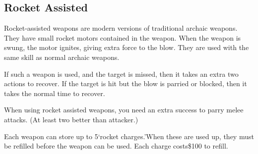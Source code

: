 \documentclass[twoside]{book}
\begin{document}
\begin{multicols}{2}
\hspace{-2ex}
\vspace{1ex}


    


\hspace{-2ex}
\vspace{1ex}


    
\end{multicols}
  
    

\subsection{Rocket Assisted}
    
    {  
    Rocket-assisted weapons are modern versions of traditional archaic weapons. They have small rocket motors contained in the weapon. When the weapon is swung, the motor ignites, giving extra force to the blow. They are used with the same skill as normal archaic weapons.
    }
  
    {  
    If such a weapon is used, and the target is missed, then it takes an extra two actions to recover. If the target is hit but the blow is parried or blocked, then it takes the normal time to recover.
    }
  
    {  
    When using rocket assisted weapons, you need an extra success to parry melee attacks. (At least two better than attacker.)
    }
  
    {  
    Each weapon can store up to 5`rocket charges.'When these are used up, they must be refilled before the weapon can be used. Each charge costs\$100 to refill.
    }
  
\end{document}

